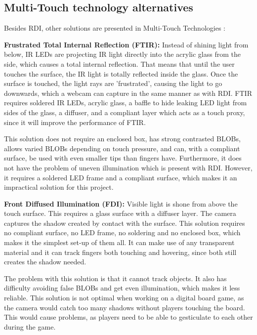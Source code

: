\subsection{Multi-Touch technology alternatives}\label{technologiesAlternatives}
Besides RDI, other solutions are presented in Multi-Touch Technologies \citep{multiTT}:

\textbf{Frustrated Total Internal Reflection (FTIR):} Instead of shining light from below, IR LEDs are projecting IR light directly into the acrylic glass from the side, which causes a total internal reflection. That means that until the user touches the surface, the IR light is totally reflected inside the glass. Once the surface is touched, the light rays are 'frustrated', causing the light to go downwards, which a webcam can capture in the same manner as with RDI. FTIR requires soldered IR LEDs, acrylic glass, a baffle to hide leaking LED light from sides of the glass, a diffuser, and a compliant layer which acts as a touch proxy, since it will improve the performance of FTIR.

This solution does not require an enclosed box, has strong contrasted BLOBs, allows varied BLOBs depending on touch pressure, and can, with a compliant surface, be used with even smaller tips than fingers have. Furthermore, it does not have the problem of uneven illumination which is present with RDI. However, it requires a soldered LED frame and a compliant surface, which makes it an impractical solution for this project.

\textbf{Front Diffused Illumination (FDI):} Visible light is shone from above the touch surface. This requires a glass surface with a diffuser layer. The camera captures the shadow created by contact with the surface. This solution requires no compliant surface, no LED frame, no soldering and no enclosed box, which makes it the simplest set-up of them all. It can make use of any transparent material and it can track fingers both touching and hovering, since both still creates the shadow needed.

The problem with this solution is that it cannot track objects. It also has difficulty avoiding false BLOBs and get even illumination, which makes it less reliable. This solution is not optimal when working on a digital board game, as the camera would catch too many shadows without players touching the board. This would cause problems, as players need to be able to gesticulate to each other during the game.

